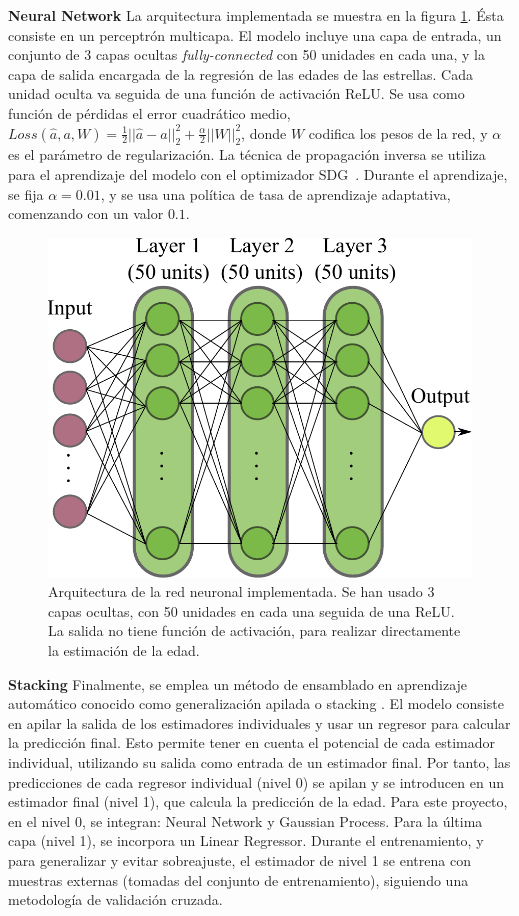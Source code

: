 \vspace{0.5cm}

\textbf{Neural Network} {} La arquitectura implementada se muestra en la figura \ref{fig:neural_network}. Ésta consiste en un perceptrón multicapa. El modelo incluye una capa de entrada, un conjunto de 3 capas ocultas \emph{fully-connected} con 50 unidades en cada una, y la capa de salida encargada de la regresión de las edades de las estrellas. Cada unidad oculta va seguida de una función de activación ReLU. Se usa como función de pérdidas el error cuadrático medio, $Loss(\hat{a},a,W) = \frac{1}{2}||\hat{a} - a ||_2^2 + \frac{\alpha}{2} ||W||_2^2$, donde $W$ codifica los pesos de la red, y $\alpha$ es el parámetro de regularización. La técnica de propagación inversa \cite{LeCun2012} se utiliza para el aprendizaje del modelo con el optimizador SDG~\cite{sgd}. Durante el aprendizaje, se fija $\alpha=0.01$, y se usa una política de tasa de aprendizaje adaptativa, comenzando con un valor $0.1$.

\vspace{0.5cm}

\begin{figure}[H]
\begin{center}
\includegraphics[width=0.6\linewidth]{Figuras/nnet.pdf}
\end{center}
\caption{Arquitectura de la red neuronal implementada. Se han usado 3 capas ocultas, con 50 unidades en cada una seguida de una ReLU. La salida no tiene función de activación, para realizar directamente la estimación de la edad.}
\label{fig:neural_network}
\end{figure}

\textbf{Stacking} {} Finalmente, se emplea un método de ensamblado en aprendizaje automático conocido como generalización apilada o stacking \cite{Wolpert1992}. El modelo consiste en apilar la salida de los estimadores individuales y usar un regresor para calcular la predicción final. Esto permite tener en cuenta el potencial de cada estimador individual, utilizando su salida como entrada de un estimador final.  %
Por tanto, las predicciones de cada regresor individual (nivel 0) se apilan y se introducen en un estimador final (nivel 1), que calcula la predicción de la edad. Para este proyecto, en el nivel 0, se integran: Neural Network y Gaussian Process. Para la última capa (nivel 1), se incorpora un Linear Regressor. Durante el entrenamiento, y para generalizar y evitar sobreajuste, el estimador de nivel 1 se entrena con muestras externas (tomadas del conjunto de entrenamiento), siguiendo una metodología de validación cruzada.

